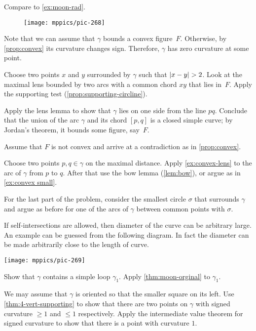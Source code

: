 \begin{multicols}{2}
 Compare to \ref{ex:moon-rad}.

\begin{wrapfigure}{r}{34 mm}
\vskip-6mm
\centering
\texttt{[image: mppics/pic-268]}
\vskip0mm
\end{wrapfigure}

Note that we can assume that $\gamma$ bounds a convex figure~$F$.
Otherwise, by \ref{prop:convex} its curvature changes sign.
Therefore, $\gamma$ has zero curvature at some point.

Choose two points $x$ and $y$ surrounded by $\gamma$ such that $|x\z-y|\z>2$.
Look at the maximal lens bounded by two arcs with a common chord $xy$ that lies in~$F$.
Apply the supporting test (\ref{prop:supporting-circline}).

Apply the lens lemma to show that $\gamma$ lies on one side from the line $pq$.
Conclude that the union of the arc $\gamma$ and its chord $[p,q]$ is a closed simple curve;
by Jordan's theorem, it bounds some figure, say~$F$.

Assume that $F$ is not convex and arrive at a contradiction as in \ref{prop:convex}. 

Choose two points $p,q\in\gamma$ on the maximal distance.
Apply \ref{ex:convex-lens} to the arc of $\gamma$ from $p$ to $q$.
After that use the bow lemma (\ref{lem:bow}), or argue as in \ref{ex:convex small}.

For the last part of the problem, consider the smallest circle $\sigma$ that surrounds $\gamma$ and argue as before for one of the arcs of $\gamma$ between common points with $\sigma$.

If self-intersections are allowed, then diameter of the curve can be arbitrary large.
An example can be guessed from the following diagram.
In fact the diameter can be made arbitrarily close to the length of curve.
\begin{Figure}
\vskip-0mm
\centering
\texttt{[image: mppics/pic-269]}
\vskip-0mm
\end{Figure}

Show that $\gamma$ contains a simple loop $\gamma_1$.
Apply \ref{thm:moon-orginal} to $\gamma_1$.

We may assume that $\gamma$ is oriented so that the smaller square on its left.
Use \ref{thm:4-vert-supporting} to show that there are two points on $\gamma$ with signed curvature $\ge 1$ and $\le 1$ respectively.
Apply the intermediate value theorem for signed curvature to show that there is a point with curvature $1$.


\end{multicols}
